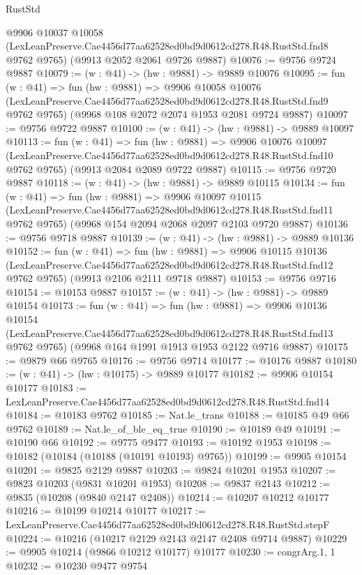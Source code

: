 \begin{lexlean}{RustStd}
\begin{coremodule}
  @9906
    @10037
    @10058
    (LexLeanPreserve.Cae4456d77aa62528ed0bd9d0612cd278.R48.RustStd.fnd8 @9762 @9765)
    (@9913 @2052 @2061 @9726 @9887)
@10076 := @9756 @9724 @9887
@10079 := (w : @41) -> (hw : @9881) -> @9889 @10076
@10095 := fun (w : @41) =>
  fun (hw : @9881) =>
  @9906
    @10058
    @10076
    (LexLeanPreserve.Cae4456d77aa62528ed0bd9d0612cd278.R48.RustStd.fnd9 @9762 @9765)
    (@9968 @108 @2072 @2074 @1953 @2081 @9724 @9887)
@10097 := @9756 @9722 @9887
@10100 := (w : @41) -> (hw : @9881) -> @9889 @10097
@10113 := fun (w : @41) =>
  fun (hw : @9881) =>
  @9906
    @10076
    @10097
    (LexLeanPreserve.Cae4456d77aa62528ed0bd9d0612cd278.R48.RustStd.fnd10 @9762 @9765)
    (@9913 @2084 @2089 @9722 @9887)
@10115 := @9756 @9720 @9887
@10118 := (w : @41) -> (hw : @9881) -> @9889 @10115
@10134 := fun (w : @41) =>
  fun (hw : @9881) =>
  @9906
    @10097
    @10115
    (LexLeanPreserve.Cae4456d77aa62528ed0bd9d0612cd278.R48.RustStd.fnd11 @9762 @9765)
    (@9968 @154 @2094 @2068 @2097 @2103 @9720 @9887)
@10136 := @9756 @9718 @9887
@10139 := (w : @41) -> (hw : @9881) -> @9889 @10136
@10152 := fun (w : @41) =>
  fun (hw : @9881) =>
  @9906
    @10115
    @10136
    (LexLeanPreserve.Cae4456d77aa62528ed0bd9d0612cd278.R48.RustStd.fnd12 @9762 @9765)
    (@9913 @2106 @2111 @9718 @9887)
@10153 := @9756 @9716
@10154 := @10153 @9887
@10157 := (w : @41) -> (hw : @9881) -> @9889 @10154
@10173 := fun (w : @41) =>
  fun (hw : @9881) =>
  @9906
    @10136
    @10154
    (LexLeanPreserve.Cae4456d77aa62528ed0bd9d0612cd278.R48.RustStd.fnd13 @9762 @9765)
    (@9968 @164 @1991 @1913 @1953 @2122 @9716 @9887)
@10175 := @9879 @66 @9765
@10176 := @9756 @9714
@10177 := @10176 @9887
@10180 := (w : @41) -> (hw : @10175) -> @9889 @10177
@10182 := @9906 @10154 @10177
@10183 := LexLeanPreserve.Cae4456d77aa62528ed0bd9d0612cd278.R48.RustStd.fnd14
@10184 := @10183 @9762
@10185 := Nat.le_trans
@10188 := @10185 @49 @66 @9762
@10189 := Nat.le_of_ble_eq_true
@10190 := @10189 @49
@10191 := @10190 @66
@10192 := @9775 @9477
@10193 := @10192 @1953
@10198 := @10182 (@10184 (@10188 (@10191 @10193) @9765))
@10199 := @9905 @10154
@10201 := @9825 @2129 @9887
@10203 := @9824 @10201 @1953
@10207 := @9823 @10203 (@9831 @10201 @1953)
@10208 := @9837 @2143
@10212 := @9835 (@10208 (@9840 @2147 @2408))
@10214 := @10207 @10212 @10177
@10216 := @10199 @10214 @10177
@10217 := LexLeanPreserve.Cae4456d77aa62528ed0bd9d0612cd278.R48.RustStd.stepF
@10224 := @10216 (@10217 @2129 @2143 @2147 @2408 @9714 @9887)
@10229 := @9905 @10214 (@9866 @10212 @10177) @10177
@10230 := congrArg.{1, 1}
@10232 := @10230 @9477 @9754

\end{coremodule}
\end{lexlean}

